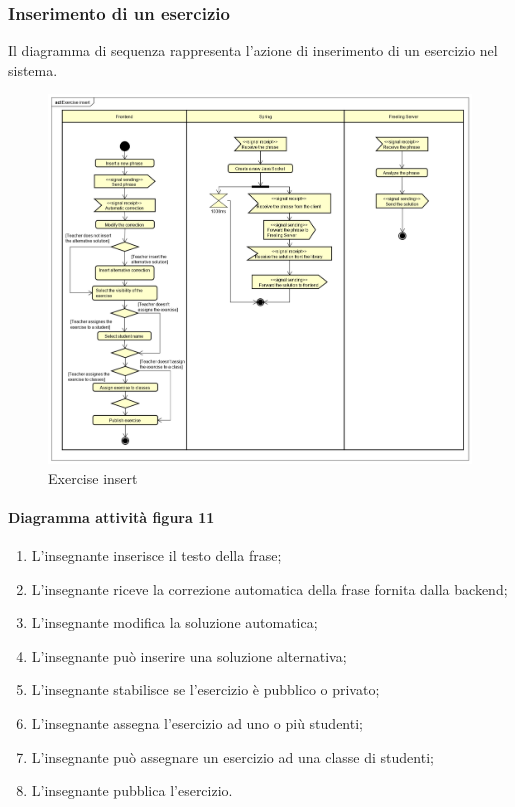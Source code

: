 \subsubsection{Inserimento di un esercizio}
Il diagramma di sequenza rappresenta l'azione di inserimento di un esercizio nel sistema.
\begin{figure}[H]
\centering
\includegraphics[width=17cm, keepaspectratio]{img/Exercise-insert.png} 
\caption{Exercise insert}
\end{figure}

\paragraph{Diagramma attività figura 11}
\begin{enumerate}
        \item L'insegnante inserisce il testo della frase;
        \item L'insegnante riceve la correzione automatica della frase fornita dalla backend;
        \item L'insegnante modifica la soluzione automatica;
        \item L'insegnante può inserire una soluzione alternativa;
        \item L'insegnante stabilisce se l'esercizio è pubblico o privato;
        \item L'insegnante assegna l'esercizio ad uno o più studenti;
        \item L'insegnante può assegnare un esercizio ad una classe di studenti;
        \item L'insegnante pubblica l'esercizio.
    \end{enumerate}

